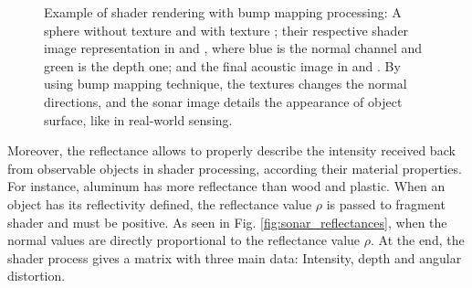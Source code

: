 \documentclass[final,5p,times]{elsarticle}
\begin{document}
\begin{figure}[t]
{        \label{fig:bump_5}
    }
    \captionsetup{justification=centering}
    \caption{Example of shader rendering with bump mapping processing: A sphere without texture  and with texture ; their respective shader image representation in  and , where blue is the normal channel and green is the depth one; and the final acoustic image in  and . By using bump mapping technique, the textures changes the normal directions, and the sonar image details the appearance of object surface, like in real-world sensing.}
    \label{fig:sonar_bump_mapping}
\end{figure}

Moreover, the reflectance allows to properly describe the intensity received back from observable objects in shader processing, according their material properties. For instance, aluminum has more reflectance than wood and plastic. When an object has its reflectivity defined, the reflectance value $\rho$ is passed to fragment shader and must be positive. As seen in Fig. \ref{fig:sonar_reflectances}, when the normal values are directly proportional to the reflectance value $\rho$. At the end, the shader process gives a matrix with three main data: Intensity, depth and angular distortion.
\end{document}
